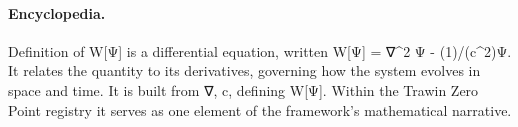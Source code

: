 \paragraph{Encyclopedia.}
Definition of W[Ψ] is a differential equation, written W[Ψ] = ∇\textasciicircum{}2 Ψ - (1)/(c\textasciicircum{}2)Ψ. It relates the quantity to its derivatives, governing how the system evolves in space and time. It is built from ∇, c, defining W[Ψ]. Within the Trawin Zero Point registry it serves as one element of the framework's mathematical narrative.
